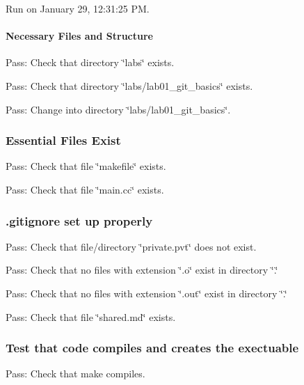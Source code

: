 Run on January 29, 12\+:31\+:25 PM.

\paragraph*{Necessary Files and Structure}


\begin{DoxyItemize}
\item Pass\+: Check that directory \char`\"{}labs\char`\"{} exists.
\item Pass\+: Check that directory \char`\"{}labs/lab01\+\_\+git\+\_\+basics\char`\"{} exists.
\item Pass\+: Change into directory \char`\"{}labs/lab01\+\_\+git\+\_\+basics\char`\"{}.
\end{DoxyItemize}

\subsubsection*{Essential Files Exist}


\begin{DoxyItemize}
\item Pass\+: Check that file \char`\"{}makefile\char`\"{} exists.
\item Pass\+: Check that file \char`\"{}main.\+cc\char`\"{} exists.
\end{DoxyItemize}

\subsubsection*{.gitignore set up properly}


\begin{DoxyItemize}
\item Pass\+: Check that file/directory \char`\"{}private.\+pvt\char`\"{} does not exist.
\item Pass\+: Check that no files with extension \char`\"{}.\+o\char`\"{} exist in directory \char`\"{}.\char`\"{}
\item Pass\+: Check that no files with extension \char`\"{}.\+out\char`\"{} exist in directory \char`\"{}.\char`\"{}
\item Pass\+: Check that file \char`\"{}shared.\+md\char`\"{} exists.
\end{DoxyItemize}

\subsubsection*{Test that code compiles and creates the exectuable}


\begin{DoxyItemize}
\item Pass\+: Check that make compiles. 
\end{DoxyItemize}